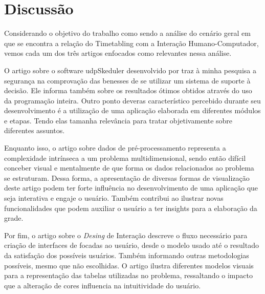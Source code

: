 \chapter{Discussão}

Considerando o objetivo do trabalho como sendo a análise do cenário geral em que se encontra a relação do Timetabling com a Interação Humano-Computador, vemos cada um dos três artigos enfocados como relevantes nessa análise.

O artigo sobre o software udpSkeduler desenvolvido por \cite{MIRANDA2012505} traz à minha pesquisa a segurança na comprovação das benesses de se utilizar um sistema de suporte à decisão. Ele informa também sobre os resultados ótimos obtidos através do uso da programação inteira. Outro ponto deveras característico percebido durante seu desenvolvimento é a utilização de uma aplicação elaborada em diferentes módulos e etapas. Tendo elas tamanha relevância para tratar objetivamente sobre diferentes assuntos.

Enquanto isso, o artigo sobre dados de pré-processamento \cite{THOMAS2009} representa a complexidade intrínseca a um problema multidimensional, sendo então difícil conceber visual e mentalmente de que forma os dados relacionados ao problema se estruturam. Dessa forma, a apresentação de diversas formas de visualização deste artigo podem ter forte influência no desenvolvimento de uma aplicação que seja interativa e engaje o usuário. Também contribui ao ilustrar novas funcionalidades que podem auxiliar o usuário a ter insights para a elaboração da grade.

Por fim, o artigo sobre o \textit{Desing} de Interação \cite{ANDRE2018} descreve o fluxo necessário para criação de interfaces de focadas ao usuário, desde o modelo usado até o resultado da satisfação dos possíveis usuários. Também informando outras metodologias possíveis, mesmo que não escolhidas. O artigo ilustra diferentes modelos visuais para a representação das tabelas utilizadas no problema, ressaltando o impacto que a alteração de cores influencia na intuitividade do usuário.
